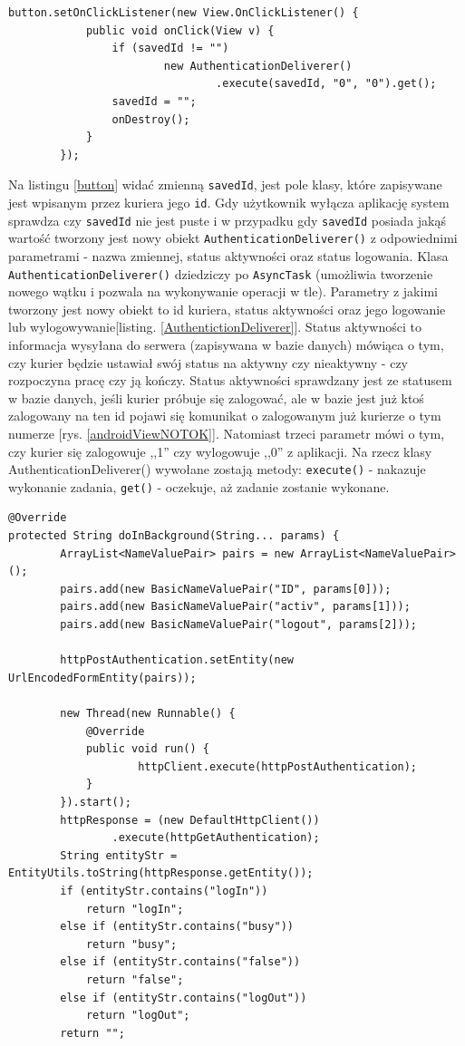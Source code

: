 \documentclass[eng,printmode,oneside]{mgr}
\begin{document}
\begin{lstlisting}[caption=Ustawienie właściwości przycisku
``Off'',label=button]
button.setOnClickListener(new View.OnClickListener() {
			public void onClick(View v) {
				if (savedId != "")
						new AuthenticationDeliverer()
								.execute(savedId, "0", "0").get();
				savedId = "";
				onDestroy();
			}
		});
\end{lstlisting}

Na listingu \ref{button} widać zmienną \texttt{savedId}, jest pole klasy, które
zapisywane jest wpisanym przez kuriera jego \texttt{id}. Gdy użytkownik wyłącza
aplikację system sprawdza czy \texttt{savedId} nie jest puste i w przypadku gdy
\texttt{savedId} posiada jakąś wartość tworzony jest nowy obiekt
\texttt{AuthenticationDeliverer()} z odpowiednimi parametrami - nazwa zmiennej, status aktywności oraz status logowania. Klasa
\texttt{AuthenticationDeliverer()} dziedziczy po \texttt{AsyncTask} (umożliwia
tworzenie nowego wątku i pozwala na wykonywanie operacji w tle). Parametry z jakimi tworzony jest
nowy obiekt to id kuriera, status aktywności oraz jego logowanie lub
wylogowywanie[listing. \ref{AuthentictionDeliverer}]. Status aktywności to informacja
wysyłana do serwera (zapisywana w bazie danych) mówiąca o tym, czy kurier będzie ustawiał swój status na aktywny
czy nieaktywny - czy rozpoczyna pracę czy ją kończy. Status aktywności
sprawdzany jest ze statusem w bazie danych, jeśli kurier próbuje się zalogować,
ale w bazie jest już ktoś zalogowany na ten id pojawi się komunikat o
zalogowanym już kurierze o tym numerze [rys. \ref{androidViewNOTOK}]. Natomiast
trzeci parametr mówi o tym, czy kurier się zalogowuje ,,1'' czy wylogowuje ,,0''
z aplikacji. Na rzecz klasy AuthenticationDeliverer() wywołane zostają metody:
\texttt{execute()} - nakazuje wykonanie zadania, \texttt{get()} - oczekuje, aż
zadanie zostanie wykonane.

\begin{lstlisting}[caption=klasa
AuthenticationDeliverer metoda doInBackground,label=AuthentictionDeliverer]
@Override 
protected String doInBackground(String... params) {
		ArrayList<NameValuePair> pairs = new ArrayList<NameValuePair>();
		pairs.add(new BasicNameValuePair("ID", params[0]));
		pairs.add(new BasicNameValuePair("activ", params[1]));
		pairs.add(new BasicNameValuePair("logout", params[2]));

		httpPostAuthentication.setEntity(new UrlEncodedFormEntity(pairs));
		
		new Thread(new Runnable() {
			@Override
			public void run() {
					httpClient.execute(httpPostAuthentication);
			}
		}).start();
		httpResponse = (new DefaultHttpClient())
				.execute(httpGetAuthentication);
		String entityStr = EntityUtils.toString(httpResponse.getEntity());
		if (entityStr.contains("logIn"))
			return "logIn";
		else if (entityStr.contains("busy"))
			return "busy";
		else if (entityStr.contains("false"))
			return "false";
		else if (entityStr.contains("logOut"))
			return "logOut";
		return "";
\end{lstlisting}
\end{document}
